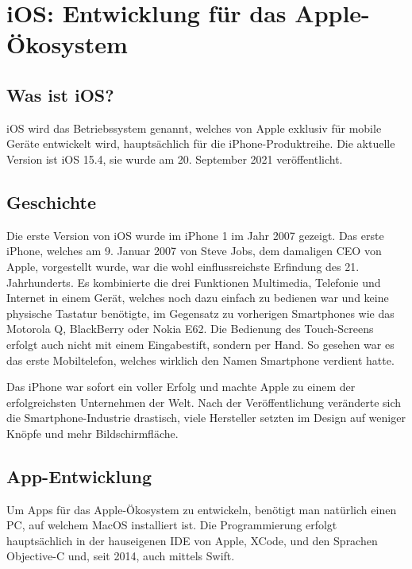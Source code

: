 \section{iOS: Entwicklung für das Apple-Ökosystem}
\label{iosdev}

\subsection{Was ist iOS?}
iOS wird das Betriebssystem genannt, welches von Apple exklusiv für mobile Geräte entwickelt wird,
hauptsächlich für die iPhone-Produktreihe. Die aktuelle Version ist iOS 15.4, sie wurde am 20.
September 2021 veröffentlicht.

\subsection{Geschichte}
Die erste Version von iOS wurde im iPhone 1 im Jahr 2007 gezeigt. Das erste iPhone, welches am 9.
Januar 2007 von Steve Jobs, dem damaligen CEO von Apple, vorgestellt wurde, war die wohl
einflussreichste Erfindung des 21. Jahrhunderts. Es kombinierte die drei Funktionen Multimedia,
Telefonie und Internet in einem Gerät, welches noch dazu einfach zu bedienen war und keine physische
Tastatur benötigte, im Gegensatz zu vorherigen Smartphones wie das Motorola Q, BlackBerry oder Nokia
E62. Die Bedienung des Touch-Screens erfolgt auch nicht mit einem Eingabestift, sondern per Hand. So
gesehen war es das erste Mobiltelefon, welches wirklich den Namen Smartphone verdient hatte.

Das iPhone war sofort ein voller Erfolg und machte Apple zu einem der erfolgreichsten Unternehmen
der Welt. Nach der Veröffentlichung veränderte sich die Smartphone-Industrie drastisch, viele
Hersteller setzten im Design auf weniger Knöpfe und mehr Bildschirmfläche.

\subsection{App-Entwicklung}
Um Apps für das Apple-Ökosystem zu entwickeln, benötigt man natürlich einen PC, auf welchem MacOS
installiert ist. Die Programmierung erfolgt hauptsächlich in der hauseigenen IDE von Apple, XCode,
und den Sprachen Objective-C und, seit 2014, auch mittels Swift.